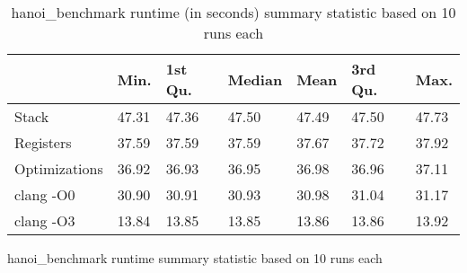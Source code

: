 \begin{table}[h!]
\centering
\begin{tabular}{p{}p{}p{}p{}p{}p{}p{}}
  \hline
 & Min. & 1st Qu. & Median & Mean & 3rd Qu. & Max. \\ 
  \hline
Stack & 47.31 & 47.36 & 47.50 & 47.49 & 47.50 & 47.73 \\ 
  Registers & 37.59 & 37.59 & 37.59 & 37.67 & 37.72 & 37.92 \\ 
  Optimizations & 36.92 & 36.93 & 36.95 & 36.98 & 36.96 & 37.11 \\ 
  clang -O0 & 30.90 & 30.91 & 30.93 & 30.98 & 31.04 & 31.17 \\ 
  clang -O3 & 13.84 & 13.85 & 13.85 & 13.86 & 13.86 & 13.92 \\ 
   \hline
\end{tabular}
\caption{hanoi\_benchmark runtime summary statistic based on 10 runs each}
\caption{hanoi\_benchmark runtime (in seconds) summary statistic based on 10 runs each}
\end{table}
